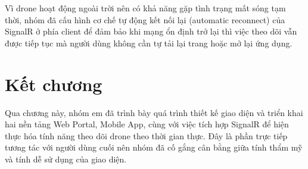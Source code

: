 Vì drone hoạt động ngoài trời nên có khả năng gặp tình trạng mất sóng tạm thời, nhóm đã cấu hình cơ chế tự động kết nối lại (automatic reconnect) của SignalR ở phía client để đảm bảo khi mạng ổn định trở lại thì việc theo dõi vẫn được tiếp tục mà người dùng không cần tự tải lại trang hoặc mở lại ứng dụng.

\section{Kết chương}

Qua chương này, nhóm em đã trình bày quá trình thiết kế giao diện và triển khai hai nền tảng Web Portal, Mobile App, cùng với việc tích hợp SignalR để hiện thực hóa tính năng theo dõi drone theo thời gian thực. Đây là phần trực tiếp tương tác với người dùng cuối nên nhóm đã cố gắng cân bằng giữa tính thẩm mỹ và tính dễ sử dụng của giao diện.